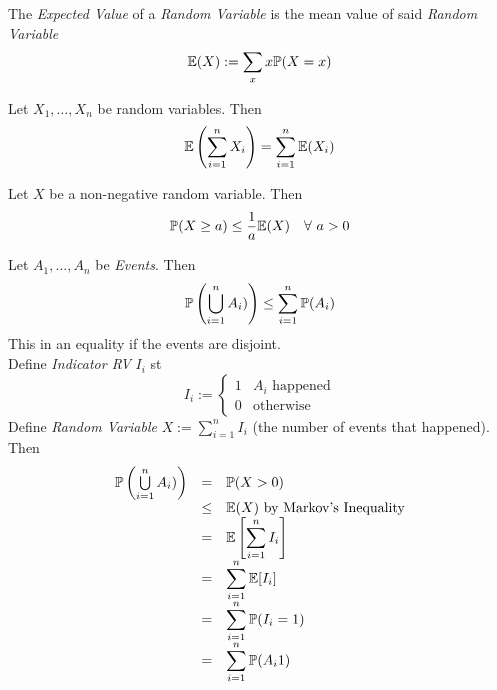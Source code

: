 \documentclass[11pt,a4paper]{article}
\begin{document}
The \textit{Expected Value} of a \textit{Random Variable} is the mean value of said \textit{Random Variable}
$$\mathbb{E}(X):=\sum_x x\mathbb{P}(X=x)$$

Let $X_1,\dots,X_n$ be random variables. Then
$$\mathbb{E}\left(\sum_{i=1}^nX_i\right)=\sum_{i=1}^n\mathbb{E}(X_i)$$

Let $X$ be a non-negative random variable. Then
$$\prob(X\geq a)\leq\frac1a\expect(X)\quad\forall\ a>0$$

Let $A_1,\dots,A_n$ be \textit{Events}. Then
$$\mathbb{P}\left(\bigcup\limits_{i=1}^nA_i)\right)\leq\sum_{i=1}^n\mathbb{P}(A_i)$$
\nb This in an equality if the events are disjoint.\\

Define \textit{Indicator RV} $I_i$ st
$$I_i:=\begin{cases}1&A_i\text{ happened}\\0&\text{otherwise}\end{cases}$$
Define \textit{Random Variable} $X:=\sum_{i=1}^nI_i$ (the number of events that happened).\\
Then
\[\begin{array}{rcl}
\mathbb{P}\left(\bigcup\limits_{i=1}^nA_i)\right)&=&\mathbb{P}(X>0)\\
&\leq&\mathbb{E}(X)\text{ by Markov's Inequality}\\
&=&\mathbb{E}\left[\displaystyle\sum_{i=1}^nI_i\right]\\
&=&\displaystyle\sum_{i=1}^n\mathbb{E}[I_i]\\
&=&\displaystyle\sum_{i=1}^n\mathbb{P}(I_i=1)\\
&=&\displaystyle\sum_{i=1}^n\mathbb{P}(A_i1)
\end{array}\]
\proved
\end{document}
